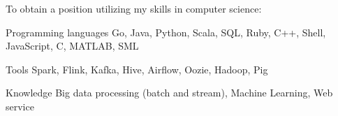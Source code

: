 

\begin{cvparagraph}

To obtain a position utilizing my skills in computer science:

\begin{cvskills}

  \cvskill
    {Programming languages} %
    {Go, Java, Python, Scala, SQL, Ruby, C++, Shell, JavaScript, C, MATLAB, SML} %

  \cvskill
    {Tools} %
    {Spark, Flink, Kafka, Hive, Airflow, Oozie, Hadoop, Pig} %

  \cvskill
    {Knowledge} %
    {Big data processing (batch and stream), Machine Learning, Web service} %

\end{cvskills}


\end{cvparagraph}
